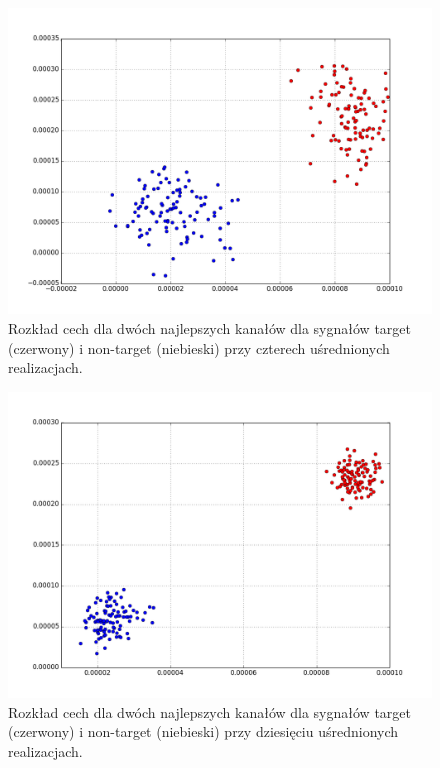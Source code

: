 \documentclass[licencjacka,openright]{pracamgr}
\begin{document}
\begin{figure}[H]
\centering
\includegraphics[scale=0.55, trim=10mm 15mm 10mm 18mm, clip=True]{pics/cecha_csp_4.png}
\caption{Rozkład cech dla dwóch najlepszych kanałów dla sygnałów target (czerwony) i non-target (niebieski) przy czterech uśrednionych realizacjach.}
\label{cecha_csp_4}
\end{figure}

\begin{figure}[H]
\centering
\includegraphics[scale=0.55, trim=10mm 15mm 10mm 18mm, clip=True]{pics/cecha_csp_10.png}
\caption{Rozkład cech dla dwóch najlepszych kanałów dla sygnałów target (czerwony) i non-target (niebieski) przy dziesięciu uśrednionych realizacjach.}
\label{cecha_csp_10}
\end{figure}
\end{document}
